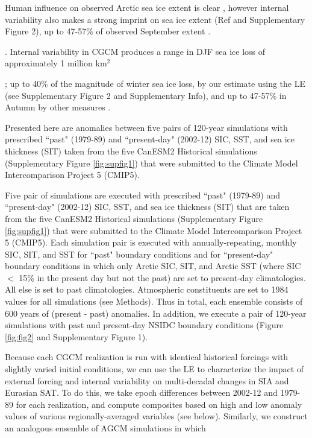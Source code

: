 \documentclass{nature}
\begin{document}
Human influence on observed Arctic sea ice extent is clear \cite{min08}, however internal variability also makes a strong imprint on sea ice extent (Ref \cite{swart15} and Supplementary Figure 2), up to 47-57\% of observed September extent \cite{stroeve07,kay11}.


. Internal variability in CGCM produces a range in DJF sea ice loss of approximately 1 million km$^2$ 

; up to 40\% of the magnitude of winter sea ice loss, by our estimate using the LE (see Supplementary Figure 2 and Supplementary Info), and up to 47-57\% in Autumn by other measures \cite{stroeve07,kay11}. 


 Presented here are anomalies between five pairs of 120-year simulations with prescribed ``past" (1979-89) and ``present-day" (2002-12) SIC, SST, and sea ice thickness (SIT) taken from the five CanESM2 Historical simulations (Supplementary Figure \ref{fig:supfig1}) that were submitted to the Climate Model Intercomparison Project 5 (CMIP5).

 Five pair of simulations are executed with prescribed ``past" (1979-89) and ``present-day" (2002-12) SIC, SST, and sea ice thickness (SIT) that are taken from the five CanESM2 Historical simulations (Supplementary Figure \ref{fig:supfig1}) that were submitted to the Climate Model Intercomparison Project 5 (CMIP5). Each simulation pair is executed with annually-repeating, monthly SIC, SIT, and SST for ``past" boundary conditions and for ``present-day" boundary conditions in which only Arctic SIC, SIT, and Arctic SST (where SIC $<$ 15\% in the present day but not the past) are set to present-day climatologies. All else is set to past climatologies. Atmospheric constituents are set to 1984 values for all simulations (see Methods). Thus in total, each ensemble consists of 600 years of (present - past) anomalies. In addition, we execute a pair of 120-year simulations with past and present-day NSIDC boundary conditions (Figure \ref{fig:fig2} and Supplementary Figure 1).



Because each CGCM realization is run with identical historical forcings with slightly varied initial conditions, we can use the LE to characterize the impact of external forcing and internal variability on multi-decadal changes in SIA and Eurasian SAT. To do this, we take epoch differences between 2002-12 and 1979-89 for each realization, and compute composites based on high and low anomaly values of various regionally-averaged variables (see below). Similarly, we construct an analogous ensemble of AGCM simulations in which  
\end{document}
